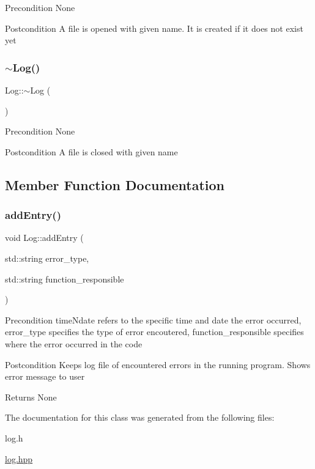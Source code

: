 \begin{DoxyPrecond}{Precondition}
None 
\end{DoxyPrecond}
\begin{DoxyPostcond}{Postcondition}
A file is opened with given name. It is created if it does not exist yet 
\end{DoxyPostcond}
\mbox{\label{classLog_a0fbfda88fbee5027c89f6eb121059360}} 
\subsubsection{\texorpdfstring{$\sim$\+Log()}{~Log()}}
{\footnotesize\ttfamily Log\+::$\sim$\+Log (\begin{DoxyParamCaption}{ }\end{DoxyParamCaption})}

\begin{DoxyPrecond}{Precondition}
None 
\end{DoxyPrecond}
\begin{DoxyPostcond}{Postcondition}
A file is closed with given name 
\end{DoxyPostcond}


\subsection{Member Function Documentation}
\mbox{\label{classLog_a1ccb79c34552336f3bd399b7c9b035d7}} 
\subsubsection{\texorpdfstring{add\+Entry()}{addEntry()}}
{\footnotesize\ttfamily void Log\+::add\+Entry (\begin{DoxyParamCaption}\item[{std\+::string}]{error\+\_\+type,  }\item[{std\+::string}]{function\+\_\+responsible }\end{DoxyParamCaption})}

\begin{DoxyPrecond}{Precondition}
time\+Ndate refers to the specific time and date the error occurred, error\+\_\+type specifies the type of error encoutered, function\+\_\+responsible specifies where the error occurred in the code 
\end{DoxyPrecond}
\begin{DoxyPostcond}{Postcondition}
Keeps log file of encountered errors in the running program. Shows error message to user 
\end{DoxyPostcond}
\begin{DoxyReturn}{Returns}
None 
\end{DoxyReturn}


The documentation for this class was generated from the following files\+:\begin{DoxyCompactItemize}
\item 
log.\+h\item 
\hyperlink{log_8hpp}{log.\+hpp}\end{DoxyCompactItemize}
